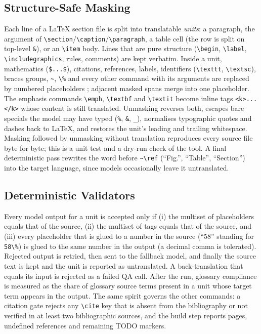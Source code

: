 \subsection{Structure-Safe Masking}
\label{sec:mask}
Each line of a LaTeX section file is split into translatable \emph{units}: a paragraph, the argument of \verb|\section|/\verb|\caption|/\verb|\paragraph|, a table cell (the row is split on top-level \verb|&|), or an \verb|\item| body. Lines that are pure structure (\verb|\begin|, \verb|\label|, \verb|\includegraphics|, rules, comments) are kept verbatim. Inside a unit, mathematics (\verb|$...$|), citations, references, labels, identifiers (\verb|\texttt|, \verb|\textsc|), braces groups, \verb|~|, \verb|\%| and every other command with its arguments are replaced by numbered placeholders ; adjacent masked spans merge into one placeholder. The emphasis commands \verb|\emph|, \verb|\textbf| and \verb|\textit| become inline tags \verb|<k>...</k>| whose content is still translated. Unmasking reverses both, escapes bare specials the model may have typed (\verb|%|, \verb|&|, \verb|_|), normalises typographic quotes and dashes back to LaTeX, and restores the unit's leading and trailing whitespace. Masking followed by unmasking without translation reproduces every source file byte for byte; this is a unit test and a dry-run check of the tool. A final deterministic pass rewrites the word before \verb|~\ref| (``Fig.'', ``Table'', ``Section'') into the target language, since models occasionally leave it untranslated.

\subsection{Deterministic Validators}
\label{sec:validators}
Every model output for a unit is accepted only if (i) the multiset of placeholders equals that of the source, (ii) the multiset of tags equals that of the source, and (iii) every placeholder that is glued to a number in the source (``58'' standing for \verb|58\%|) is glued to the same number in the output (a decimal comma is tolerated). Rejected output is retried, then sent to the fallback model, and finally the source text is kept and the unit is reported as untranslated. A back-translation that equals its input is rejected as a failed QA call. After the run, glossary compliance is measured as the share of glossary source terms present in a unit whose target term appears in the output. The same spirit governs the other commands: a citation gate rejects any \verb|\cite| key that is absent from the bibliography or not verified in at least two bibliographic sources, and the build step reports pages, undefined references and remaining TODO markers.

